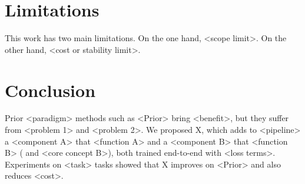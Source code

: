 \section{Limitations}
This work has two main limitations.
On the one hand, <scope limit>.
On the other hand, <cost or stability limit>.

\section{Conclusion}
Prior <paradigm> methods such as <Prior> \cite{Placeholder-A} bring <benefit>, but they suffer from <problem 1> and <problem 2>.
We proposed X, which adds to <pipeline> a <component A> that <function A> and a <component B> that <function B> ( and <core concept B>), both trained end-to-end with <loss terms>.
Experiments on <task> tasks showed that X improves on <Prior> and also reduces <cost>.
\label{main-text-end}
